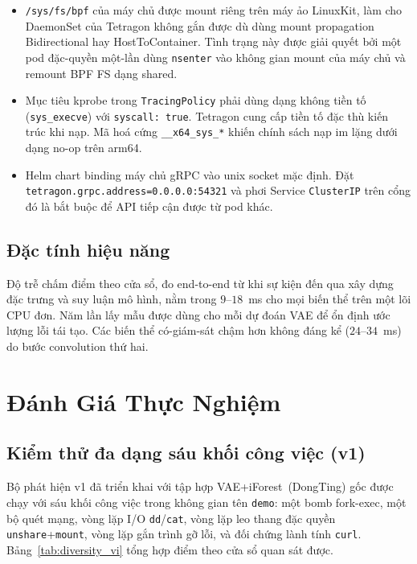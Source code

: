 \begin{itemize}
  \item \texttt{/sys/fs/bpf} của máy chủ được mount riêng trên máy ảo
        LinuxKit, làm cho DaemonSet của Tetragon không gắn được dù
        dùng mount propagation Bidirectional hay HostToContainer. Tình
        trạng này được giải quyết bởi một pod đặc-quyền một-lần dùng
        \texttt{nsenter} vào không gian mount của máy chủ và remount
        BPF FS dạng shared.
  \item Mục tiêu kprobe trong \texttt{TracingPolicy} phải dùng dạng
        không tiền tố (\texttt{sys\_execve}) với \texttt{syscall: true}.
        Tetragon cung cấp tiền tố đặc thù kiến trúc khi nạp. Mã hoá
        cứng \texttt{\_\_x64\_sys\_*} khiến chính sách nạp im lặng dưới
        dạng no-op trên arm64.
  \item Helm chart binding máy chủ gRPC vào unix socket mặc định. Đặt
        \texttt{tetragon.grpc.address=0.0.0.0:54321} và phơi Service
        \texttt{ClusterIP} trên cổng đó là bắt buộc để API tiếp cận
        được từ pod khác.
\end{itemize}

\subsection{Đặc tính hiệu năng}
Độ trễ chấm điểm theo cửa sổ, đo end-to-end từ khi sự kiện đến qua
xây dựng đặc trưng và suy luận mô hình, nằm trong $9$--$18$~ms cho
mọi biến thể trên một lõi CPU đơn. Năm lần lấy mẫu được dùng cho
mỗi dự đoán VAE để ổn định ước lượng lỗi tái tạo. Các biến thể
có-giám-sát chậm hơn không đáng kể ($24$--$34$~ms) do bước convolution
thứ hai.

\FloatBarrier
\section{Đánh Giá Thực Nghiệm}
\label{sec:evaluation_vi}

\subsection{Kiểm thử đa dạng sáu khối công việc (v1)}
\label{subsec:diversity_vi}
Bộ phát hiện v1 đã triển khai với tập hợp VAE+iForest~(DongTing) gốc
được chạy với sáu khối công việc trong không gian tên \texttt{demo}:
một bomb fork-exec, một bộ quét mạng, vòng lặp I/O \texttt{dd}/\texttt{cat},
vòng lặp leo thang đặc quyền \texttt{unshare}+\texttt{mount}, vòng lặp
gắn trình gỡ lỗi, và đối chứng lành tính \texttt{curl}.
Bảng~\ref{tab:diversity_vi} tổng hợp điểm theo cửa sổ quan sát được.

